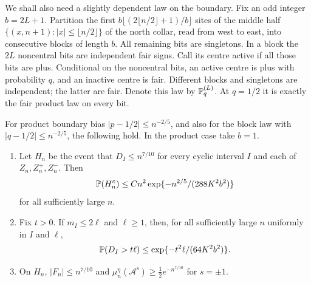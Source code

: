 We shall also need a slightly dependent law on the boundary. Fix an odd integer $b=2L+1$. Partition the first $b\lfloor(2\lfloor n/2\rfloor+1)/b\rfloor$ sites of the middle half $\{(x,n+1):|x|\le\lfloor n/2\rfloor\}$ of the north collar, read from west to east, into consecutive blocks of length $b$. All remaining bits are singletons. In a block the $2L$ noncentral bits are independent fair signs. Call its centre active if all those bits are plus. Conditional on the noncentral bits, an active centre is plus with probability $q$, and an inactive centre is fair. Different blocks and singletons are independent; the latter are fair. Denote this law by $\mathbb P_q^{(L)}$. At $q=1/2$ it is exactly the fair product law on every bit.

\begin{lemma}\label{lem:ratios}
For product boundary bias $|p-1/2|\le n^{-2/5}$, and also for the block law with $|q-1/2|\le n^{-2/5}$, the following hold. In the product case take $b=1$.
\begin{enumerate}
\item Let $H_n$ be the event that $D_I\le n^{7/10}$ for every cyclic interval $I$ and each of $Z_n,Z_n^+,Z_n^-$. Then
\begin{equation}\label{eq:H}
 \mathbb P(H_n^c)\le Cn^2\exp\{-n^{2/5}/(288K^2b^2)\}
\end{equation}
for all sufficiently large $n$.
\item Fix $t>0$. If $m_I\le2\ell$ and $\ell\ge1$, then, for all sufficiently large $n$ uniformly in $I$ and $\ell$,
\begin{equation}\label{eq:localratio}
 \mathbb P(D_I>t\ell)\le\exp\{-t^2\ell/(64K^2b^2)\}.
\end{equation}
\item On $H_n$, $|F_n|\le n^{7/10}$ and $\mu_n^\eta(\mathcal A^s)\ge\tfrac12e^{-n^{7/10}}$ for $s=\pm1$.
\end{enumerate}
\end{lemma}
